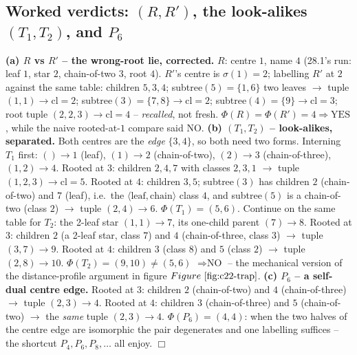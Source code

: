 \subsection{Worked verdicts: \((R,R')\), the look-alikes \((T_1,T_2)\), and \(P_6\)}

\begin{tracebox}
\textbf{(a) \(R\) vs \(R'\) -- the wrong-root lie, corrected.} \(R\): centre
\(1\), name \(4\) (28.1's run: leaf \(1\), star \(2\), chain-of-two \(3\), root
\(4\)).  \(R'\)'s centre is \(\sigma(1)=2\); labelling \(R'\) at \(2\) against the
same table: children \(5,3,4\); subtree\((5)=\{1,6\}\) two leaves \(\to\) tuple
\((1,1)\to\mathrm{cl}=2\); subtree\((3)=\{7,8\}\to\mathrm{cl}=2\);
subtree\((4)=\{9\}\to\mathrm{cl}=3\); root tuple \((2,2,3)\to\mathrm{cl}=4\) --
\emph{recalled}, not fresh.  \(\Phi(R)=\Phi(R')=4\Rightarrow\boxed{\text{YES}}\),
while the naive rooted-at-\(1\) compare said NO.
\textbf{(b) \((T_1,T_2)\) -- look-alikes, separated.} Both centres are the
\emph{edge} \(\{3,4\}\), so both need two forms. Interning \(T_1\) first:
\(()\to1\) (leaf), \((1)\to2\) (chain-of-two), \((2)\to3\) (chain-of-three),
\((1,2)\to4\).  Rooted at \(3\): children \(2,4,7\) with classes
\(2,3,1\) \(\to\) tuple \((1,2,3)\to\mathrm{cl}=5\).  Rooted at \(4\): children
\(3,5\); subtree\((3)\) has children \(2\) (chain-of-two) and \(7\) (leaf), i.e.\ the
\(\langle\text{leaf},\text{chain}\rangle\) class \(4\), and subtree\((5)\) is a
chain-of-two (class \(2\)) \(\to\) tuple \((2,4)\to6\).
\(\Phi(T_1)=(5,6)\).  Continue on the same table for \(T_2\): the 2-leaf star
\((1,1)\to7\), its one-child parent \((7)\to8\).  Rooted at \(3\): children \(2\)
(a 2-leaf star, class \(7\)) and \(4\) (chain-of-three, class \(3\)) \(\to\) tuple
\((3,7)\to9\).  Rooted at \(4\): children \(3\) (class \(8\)) and \(5\) (class
\(2\)) \(\to\) tuple \((2,8)\to10\).  \(\Phi(T_2)=(9,10)\neq(5,6)\)
\(\Rightarrow\boxed{\text{NO}}\) -- the mechanical version of the distance-profile
argument in figure \(\figref{c22-trap}\).
\textbf{(c) \(P_6\) -- a self-dual centre edge.} Rooted at \(3\): children \(2\)
(chain-of-two) and \(4\) (chain-of-three) \(\to\) tuple \((2,3)\to4\).  Rooted at
\(4\): children \(3\) (chain-of-three) and \(5\) (chain-of-two) \(\to\) the
\emph{same} tuple \((2,3)\to4\).  \(\Phi(P_6)=(4,4)\): when the two halves of the
centre edge are isomorphic the pair degenerates and one labelling suffices --
the shortcut \(P_4,P_6,P_8,\dots\) all enjoy. \(\Box\)
\end{tracebox}

